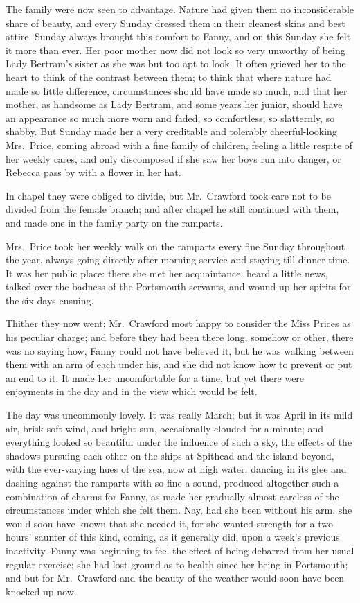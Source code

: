 \documentclass{article}
\begin{document}
The family were now seen to advantage.  Nature had given
them no inconsiderable share of beauty, and every Sunday
dressed them in their cleanest skins and best attire.
Sunday always brought this comfort to Fanny, and on this
Sunday she felt it more than ever.  Her poor mother now
did not look so very unworthy of being Lady Bertram's
sister as she was but too apt to look.  It often grieved
her to the heart to think of the contrast between them;
to think that where nature had made so little difference,
circumstances should have made so much, and that her mother,
as handsome as Lady Bertram, and some years her junior,
should have an appearance so much more worn and faded,
so comfortless, so slatternly, so shabby.  But Sunday
made her a very creditable and tolerably cheerful-looking
Mrs.\ Price, coming abroad with a fine family of children,
feeling a little respite of her weekly cares, and only
discomposed if she saw her boys run into danger, or Rebecca
pass by with a flower in her hat.

In chapel they were obliged to divide, but Mr.\ Crawford
took care not to be divided from the female branch;
and after chapel he still continued with them, and made
one in the family party on the ramparts.

Mrs.\ Price took her weekly walk on the ramparts every
fine Sunday throughout the year, always going directly
after morning service and staying till dinner-time. It
was her public place:  there she met her acquaintance,
heard a little news, talked over the badness of the
Portsmouth servants, and wound up her spirits for the six
days ensuing.

Thither they now went; Mr.\ Crawford most happy to consider
the Miss Prices as his peculiar charge; and before they
had been there long, somehow or other, there was no
saying how, Fanny could not have believed it, but he
was walking between them with an arm of each under his,
and she did not know how to prevent or put an end to it.
It made her uncomfortable for a time, but yet there
were enjoyments in the day and in the view which would
be felt.

The day was uncommonly lovely.  It was really March;
but it was April in its mild air, brisk soft wind,
and bright sun, occasionally clouded for a minute;
and everything looked so beautiful under the influence
of such a sky, the effects of the shadows pursuing each
other on the ships at Spithead and the island beyond,
with the ever-varying hues of the sea, now at high water,
dancing in its glee and dashing against the ramparts with
so fine a sound, produced altogether such a combination
of charms for Fanny, as made her gradually almost careless
of the circumstances under which she felt them.  Nay, had she
been without his arm, she would soon have known that she
needed it, for she wanted strength for a two hours'
saunter of this kind, coming, as it generally did,
upon a week's previous inactivity.  Fanny was beginning
to feel the effect of being debarred from her usual
regular exercise; she had lost ground as to health
since her being in Portsmouth; and but for Mr.\ Crawford
and the beauty of the weather would soon have been knocked
up now.
\end{document}
